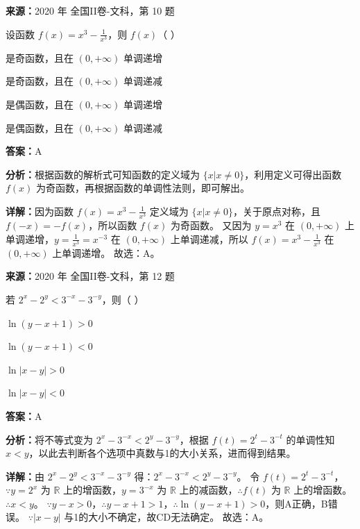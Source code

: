 \begin{question}[points=5]
\textbf{来源：}2020 年 全国II卷-文科，第 10 题\par
设函数 $f(x)=x^3-\frac{1}{x^3}$，则 $f(x)$（ ）
\begin{choices}
  \item 是奇函数，且在 $(0,+\infty)$ 单调递增
  \item 是奇函数，且在 $(0,+\infty)$ 单调递减
  \item 是偶函数，且在 $(0,+\infty)$ 单调递增
  \item 是偶函数，且在 $(0,+\infty)$ 单调递减
\end{choices}
\begin{solution}
\textbf{答案：}A

\textbf{分析：}根据函数的解析式可知函数的定义域为 $\{x|x\neq0\}$，利用定义可得出函数 $f(x)$ 为奇函数，再根据函数的单调性法则，即可解出。

\textbf{详解：}因为函数 $f(x)=x^3-\frac{1}{x^3}$ 定义域为 $\{x|x\neq0\}$，关于原点对称，且 $f(-x) = -f(x)$，所以函数 $f(x)$ 为奇函数。
又因为 $y=x^3$ 在 $(0,+\infty)$ 上单调递增，$y=\frac{1}{x^3}=x^{-3}$ 在 $(0,+\infty)$ 上单调递减，所以 $f(x)=x^3-\frac{1}{x^3}$ 在 $(0,+\infty)$ 上单调递增。
故选：A。
\end{solution}
\end{question}

\begin{question}[points=5]
\textbf{来源：}2020 年 全国II卷-文科，第 12 题\par
若 $2^x-2^y < 3^{-x}-3^{-y}$，则（ ）
\begin{choices}
  \item $\ln(y-x+1)>0$
  \item $\ln(y-x+1)<0$
  \item $\ln|x-y|>0$
  \item $\ln|x-y|<0$
\end{choices}
\begin{solution}
\textbf{答案：}A

\textbf{分析：}将不等式变为 $2^x-3^{-x}<2^y-3^{-y}$，根据 $f(t)=2^t-3^{-t}$ 的单调性知 $x<y$，以此去判断各个选项中真数与1的大小关系，进而得到结果。

\textbf{详解：}由 $2^x-2^y < 3^{-x}-3^{-y}$ 得：$2^x-3^{-x} < 2^y-3^{-y}$。
令 $f(t)=2^t-3^{-t}$，$\because y=2^x$ 为 $\mathbb{R}$ 上的增函数，$y=3^{-x}$ 为 $\mathbb{R}$ 上的减函数，$\therefore f(t)$ 为 $\mathbb{R}$ 上的增函数。
$\therefore x<y$。
$\because y-x>0$，$\therefore y-x+1>1$，$\therefore \ln(y-x+1)>0$，则A正确，B错误。
$\because |x-y|$ 与1的大小不确定，故CD无法确定。
故选：A。
\end{solution}
\end{question}

